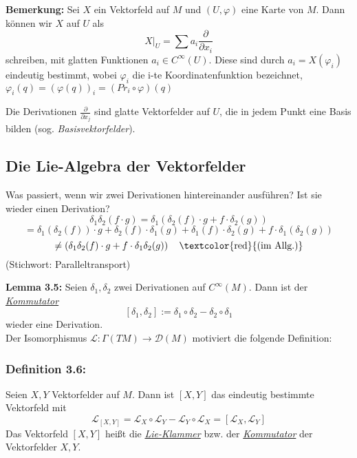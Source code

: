 \documentclass[fleqn, 12pt, letterpaper]{article}
\begin{document}
\textbf{Bemerkung:}
Sei \( X \) ein Vektorfeld auf \( M \) und \( (U, \varphi) \) eine Karte von \( M \). Dann können wir \( X \) auf \( U \) als
\[
X|_U = \sum a_i \frac{\partial}{\partial x_i}
\]
schreiben, mit glatten Funktionen \( a_i \in C^\infty(U) \). Diese sind durch
\(a_i = X(\varphi_i) \) eindeutig bestimmt, wobei $\varphi_i$ die i-te Koordinatenfunktion bezeichnet, $\varphi_i(q) = (\varphi(q))_i = (Pr_i \circ \varphi)(q)$

Die Derivationen \( \frac{\partial}{\partial x_j} \) sind glatte Vektorfelder auf \( U \), die in jedem Punkt eine Basis bilden 
(sog. \emph{Basisvektorfelder}).

\subsection{Die Lie-Algebra der Vektorfelder}

Was passiert, wenn wir zwei Derivationen hintereinander ausführen? Ist sie wieder einen Derivation?
\[
\delta_1 \delta_2 (f \cdot g) 
= \delta_1 \left( \delta_2(f) \cdot g + f \cdot \delta_2(g) \right)
\]
\[
= \delta_1(\delta_2(f)) \cdot g + \delta_2(f) \cdot \delta_1(g)
+ \delta_1(f) \cdot \delta_2(g) + f \cdot \delta_1(\delta_2(g))
\]
\[
\neq \left( \delta_1 \delta_2(f) \cdot g + f \cdot \delta_1 \delta_2(g) \right)
\quad \text{\textcolor{red}{(im Allg.)}}
\]
(Stichwort: Paralleltransport)
\medskip

\textbf{Lemma 3.5:} 
Seien \( \delta_1, \delta_2 \) zwei Derivationen auf \( C^\infty(M) \). Dann ist der \emph{\underline{Kommutator}}
\[
[\delta_1, \delta_2] := \delta_1 \circ \delta_2 - \delta_2 \circ \delta_1
\]
wieder eine Derivation.\\

Der Isomorphismus \( \mathcal{L} \colon \Gamma(TM) \to \mathcal{D}(M) \) motiviert die folgende Definition:

\medskip

\subsubsection*{Definition 3.6:}
Seien \( X, Y \) Vektorfelder auf \( M \). Dann ist \([X, Y]\) das eindeutig bestimmte Vektorfeld mit
\[
\mathcal{L}_{[X,Y]} =\mathcal{L}_X \circ \mathcal{L}_Y-\mathcal{L}_Y \circ \mathcal{L}_X= [\mathcal{L}_X, \mathcal{L}_Y]
\]
Das Vektorfeld \([X,Y]\) heißt die \emph{\underline{Lie-Klammer}} bzw. der \emph{\underline{Kommutator}} der Vektorfelder \( X, Y \).\\
\end{document}
